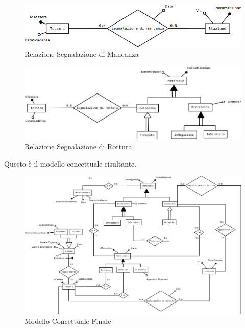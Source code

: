 \documentclass[a4paper,twoside]{article}
\begin{document}
\begin{figure}[H]
 \centering
  \includegraphics[width=1\textwidth]{Immagini-Grafici/Concettuale14.png}
\caption{Relazione Segnalazione di Mancanza}
\end{figure}
\begin{figure}[H]
 \centering
  \includegraphics[width=1\textwidth]{Immagini-Grafici/Concettuale15.png}
\caption{Relazione Segnalazione di Rottura}
\end{figure}
Questo è il modello concettuale risultante.
\begin{figure}[H]
 \centering
  \includegraphics[width=1\textwidth]{Immagini-Grafici/ConcettualeFinale.png}
\caption{Modello Concettuale Finale}
\end{figure}
\end{document}
